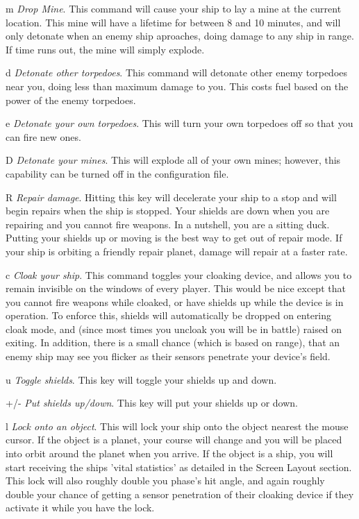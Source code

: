 \begin{list}{}{
	\renewcommand{\makelabel}[1]{{\tt #1 \hfill}}
         \setlength{\leftmargin}{.5in}
         \setlength{\labelwidth}{\leftmargin}
         \setlength{\labelsep}{0in}
}
\item[m]{\em Drop Mine}.
This command will cause your ship to lay a mine at the current location.
This mine will have a lifetime for between 8 and 10 minutes, and will only
detonate when an enemy ship aproaches, doing damage to any ship in range.
If time runs out, the mine will simply explode.

\item[d]{\em Detonate other torpedoes}.
This command will detonate other enemy torpedoes near you, doing less
than maximum damage to you. This costs fuel based on the power of
the enemy torpedoes.

\item[e]{\em Detonate your own torpedoes}.
This will turn your own torpedoes off so that you can fire new ones.

\item[D]{\em Detonate your mines}.
This will explode all of your own mines; however, this capability can be 
turned off in the configuration file.

\item[R]{\em Repair damage}.
Hitting this key will decelerate your ship to a stop and will begin
repairs when the ship is stopped.  Your shields are down when you are
repairing and you cannot fire weapons.  In a nutshell, you are a
sitting duck.  Putting your shields up or moving is the best way to get
out of repair mode.  If your ship is orbiting a friendly repair planet,
damage will repair at a faster rate.

\item[c]{\em Cloak your ship}.
This command toggles your cloaking device, and allows you to remain 
invisible on the windows of every player.  This would be nice except that you cannot
fire weapons while cloaked, or have shields up while the device is in operation.
To enforce this, shields will automatically be dropped on entering cloak mode, and
(since most times you uncloak you will be in battle) raised on exiting.
In addition, there is a small chance (which is based on range), that an enemy ship
may see you flicker as their sensors penetrate your device's field.

\item[u]{\em Toggle shields}.
This key will toggle your shields up and down.

\item[+/-]{\em Put shields up/down}.
This key will put your shields up or down.

\item[l]{\em Lock onto an object}.
This will lock your ship onto the object nearest the mouse cursor. If the object
is a planet, your course will change and you will be placed into orbit around
the planet when you arrive. If the object is a ship, you will start receiving
the ships 'vital statistics' as detailed in the {\bold Screen Layout} section.
This lock will also roughly double you phase's hit angle, and again roughly
double your chance of getting a sensor penetration of their cloaking device
if they activate it while you have the lock.


\end{list}
